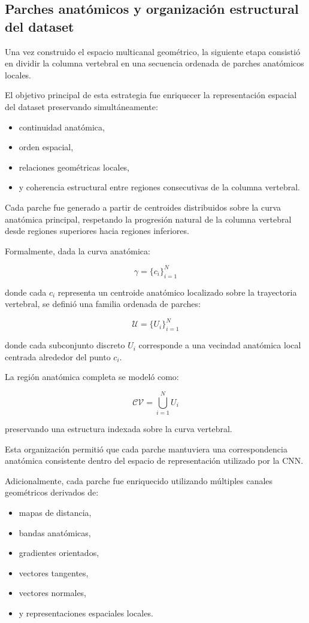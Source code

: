 \documentclass[conference]{IEEEtran}
\begin{document}
\subsection{Parches anatómicos y organización estructural del dataset}

Una vez construido el espacio multicanal geométrico, la siguiente etapa consistió en dividir la columna vertebral en una secuencia ordenada de parches anatómicos locales.

El objetivo principal de esta estrategia fue enriquecer la representación espacial del dataset preservando simultáneamente:

\begin{itemize}
    \item continuidad anatómica,
    \item orden espacial,
    \item relaciones geométricas locales,
    \item y coherencia estructural entre regiones consecutivas de la columna vertebral.
\end{itemize}

Cada parche fue generado a partir de centroides distribuidos sobre la curva anatómica principal, respetando la progresión natural de la columna vertebral desde regiones superiores hacia regiones inferiores.

Formalmente, dada la curva anatómica:

\[
\gamma = \{c_i\}_{i=1}^{N}
\]

donde cada $c_i$ representa un centroide anatómico localizado sobre la trayectoria vertebral, se definió una familia ordenada de parches:

\[
\mathcal{U}=\{U_i\}_{i=1}^{N}
\]

donde cada subconjunto discreto $U_i$ corresponde a una vecindad anatómica local centrada alrededor del punto $c_i$.

La región anatómica completa se modeló como:

\[
\mathcal{CV}
=
\bigcup_{i=1}^{N} U_i
\]

preservando una estructura indexada sobre la curva vertebral.

Esta organización permitió que cada parche mantuviera una correspondencia anatómica consistente dentro del espacio de representación utilizado por la CNN.

Adicionalmente, cada parche fue enriquecido utilizando múltiples canales geométricos derivados de:

\begin{itemize}
    \item mapas de distancia,
    \item bandas anatómicas,
    \item gradientes orientados,
    \item vectores tangentes,
    \item vectores normales,
    \item y representaciones espaciales locales.
\end{itemize}
\end{document}
